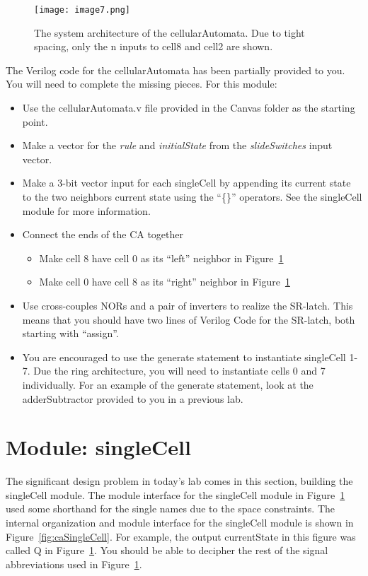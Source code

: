 \begin{figure}[ht]
\texttt{[image: image7.png]}
\caption{The system architecture of the cellularAutomata. Due to tight
spacing, only the n inputs to cell8 and cell2 are shown.}
\label{fig:caSysArch}
\end{figure}

\protect\hypertarget{cellularAutomata_verilog}{}{}The Verilog code for
the cellularAutomata has been partially provided to you. You will need
to complete the missing pieces. For this module:

\begin{itemize}
\item
Use the cellularAutomata.v file provided in the Canvas folder as the
starting point.
\item
Make a vector for the \emph{rule} and \emph{initialState} from the
\emph{slideSwitches} input vector.
\item
Make a 3-bit vector input for each singleCell by appending its current
state to the two neighbors current state using the ``\{\}'' operators.
See the singleCell module for more information.
\item
Connect the ends of the CA together

\begin{itemize}
    \item
        Make cell 8 have cell 0 as its ``left'' neighbor in Figure~\ref{fig:caSysArch}
    \item
        Make cell 0 have cell 8 as its ``right'' neighbor in Figure~\ref{fig:caSysArch}
\end{itemize}
\item
Use cross-couples NORs and a pair of inverters to realize the SR-latch. This means that you
should have two lines of Verilog Code for the SR-latch, both starting
with ``assign''.
\item
You are encouraged to use the generate statement to instantiate
singleCell 1-7. Due the ring architecture, you will need to
instantiate cells 0 and 7 individually. For an example of the generate
statement, look at the adderSubtractor provided to you in a previous
lab.
\end{itemize}

\section{Module: singleCell}

The significant design problem in today's lab comes in this section,
building the singleCell module. The module interface for the singleCell
module in Figure~\ref{fig:caSysArch} used some shorthand for the single names due to the
space constraints. The internal organization and module interface for
the singleCell module is shown in Figure~\ref{fig:caSingleCell}. For example, the output
currentState in this figure was called Q in Figure~\ref{fig:caSysArch}. You should be able
to decipher the rest of the signal abbreviations used in Figure~\ref{fig:caSysArch}.

